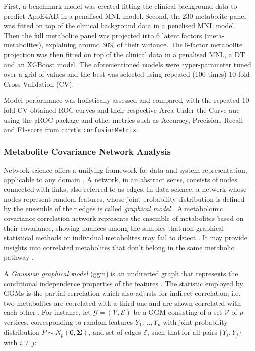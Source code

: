 \documentclass{amsart}
\begin{document}
First, a benchmark model was created fitting the clinical background data to predict ApoE4AD in a penalised MNL model. Second, the 230-metabolite panel was fitted on top of the clinical background data in a penalised MNL model. Then the full metabolite panel was projected into 6 latent factors (meta-metabolites), explaining around 30\% of their variance. The 6-factor metabolite projection was then fitted on top of the clinical data in a penalised MNL, a DT and an XGBoost model. The aforementioned models were hyper-parameter tuned over a grid of values and the best was selected using repeated (100 times) 10-fold Cross-Validation (CV). 

Model performance was holistically assessed and compared, with the repeated 10-fold CV-obtained ROC curves and their respective Area Under the Curve \acrshort{auc} using the \textsf{pROC} package \cite{pROC} and other metrics such as Accuracy, Precision, Recall and F1-score from \textsf{caret}'s \texttt{confusionMatrix}.

\subsubsection{Metabolite Covariance Network Analysis}\label{rq3}
Network science offers a unifying framework for data and system representation, applicable to any domain \cite{Barabasi2015NetworkScience}. A network, in an abstract sense, consists of nodes connected with links, also referred to as edges. In data science, a network whose nodes represent random features, whose joint probability distribution is defined by the ensemble of their edges is called \textit{graphical model} \cite{Peeters2022Rags2ridges:Matrices}. A metabolomic covariance correlation network represents the ensemble of metabolites based on their covariance, showing nuances among the samples that non-graphical statistical methods on individual metabolites may fail to detect \cite{PerezDeSouza2020Network-basedInterpretation}. It may provide insights into correlated metabolites that don't belong in the same metabolic pathway \cite{PerezDeSouza2020Network-basedInterpretation}.


A \textit{Gaussian graphical model} (\acrshort{ggm}) is an undirected graph that represents the conditional independence properties of the features \cite{KollerProbabilisticTechniques}. The statistic employed by GGMs is the partial correlation which also adjusts for indirect correlation, i.e. two metabolites are correlated with a third one and are shown correlated with each other \cite{Amara2022NetworksInterpretation}. For instance, let $\mathcal{G=(V,E)}$ be a GGM consisting of a set $\mathcal{V}$ of $p$ vertices, corresponding to random features $Y_1,...,Y_p$ with joint probability distribution $P \sim N_p(\mathbf{0, \Sigma})$, and set of edges $\mathcal{E}$, such that for all pairs $\{Y_i , Y_j\}$ with $i\neq j$:
\end{document}
